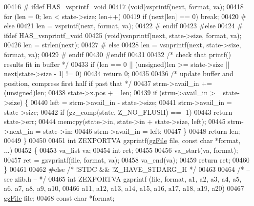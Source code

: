 \begin{DoxyCode}
00416 \textcolor{preprocessor}{#  ifdef HAS\_vsprintf\_void}
00417     (void)vsprintf(next, format, va);
00418     \textcolor{keywordflow}{for} (len = 0; len < state->size; len++)
00419         \textcolor{keywordflow}{if} (next[len] == 0) \textcolor{keywordflow}{break};
00420 \textcolor{preprocessor}{#  else}
00421     len = vsprintf(next, format, va);
00422 \textcolor{preprocessor}{#  endif}
00423 \textcolor{preprocessor}{#else}
00424 \textcolor{preprocessor}{#  ifdef HAS\_vsnprintf\_void}
00425     (void)vsnprintf(next, state->size, format, va);
00426     len = strlen(next);
00427 \textcolor{preprocessor}{#  else}
00428     len = vsnprintf(next, state->size, format, va);
00429 \textcolor{preprocessor}{#  endif}
00430 \textcolor{preprocessor}{#endif}
00431 
00432     \textcolor{comment}{/* check that printf() results fit in buffer */}
00433     \textcolor{keywordflow}{if} (len == 0 || (\textcolor{keywordtype}{unsigned})len >= state->size || next[state->size - 1] != 0)
00434         \textcolor{keywordflow}{return} 0;
00435 
00436     \textcolor{comment}{/* update buffer and position, compress first half if past that */}
00437     strm->avail\_in += (unsigned)len;
00438     state->x.pos += len;
00439     \textcolor{keywordflow}{if} (strm->avail\_in >= state->size) \{
00440         left = strm->avail\_in - state->size;
00441         strm->avail\_in = state->size;
00442         \textcolor{keywordflow}{if} (gz\_comp(state, Z\_NO\_FLUSH) == -1)
00443             \textcolor{keywordflow}{return} state->err;
00444         memcpy(state->in, state->in + state->size, left);
00445         strm->next\_in = state->in;
00446         strm->avail\_in = left;
00447     \}
00448     \textcolor{keywordflow}{return} len;
00449 \}
00450 
00451 \textcolor{keywordtype}{int} ZEXPORTVA gzprintf(\hyperlink{structgz_file__s}{gzFile} file, \textcolor{keyword}{const} \textcolor{keywordtype}{char} *format, ...)
00452 \{
00453     va\_list va;
00454     \textcolor{keywordtype}{int} ret;
00455 
00456     va\_start(va, format);
00457     ret = gzvprintf(file, format, va);
00458     va\_end(va);
00459     \textcolor{keywordflow}{return} ret;
00460 \}
00461 
00462 \textcolor{preprocessor}{#else }\textcolor{comment}{/* !STDC && !Z\_HAVE\_STDARG\_H */}\textcolor{preprocessor}{}
00463 
00464 \textcolor{comment}{/* -- see zlib.h -- */}
00465 \textcolor{keywordtype}{int} ZEXPORTVA gzprintf (file, format, a1, a2, a3, a4, a5, a6, a7, a8, a9, a10,
00466                        a11, a12, a13, a14, a15, a16, a17, a18, a19, a20)
00467     \hyperlink{structgz_file__s}{gzFile} file;
00468     \textcolor{keyword}{const} \textcolor{keywordtype}{char} *format;

\end{DoxyCode}
